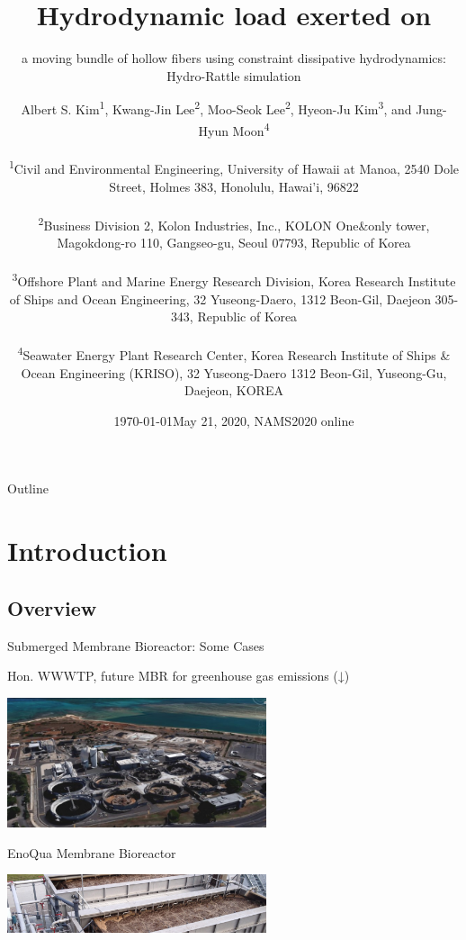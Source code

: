 \documentclass[t,presentation]{beamer}
\date{\tiny\printdayoff\today}
\author{Albert S. Kim\textsuperscript{1}, Kwang-Jin Lee\textsuperscript{2}, Moo-Seok Lee\textsuperscript{2}, Hyeon-Ju Kim\textsuperscript{3}, and Jung-Hyun Moon\textsuperscript{4}  \\ \vspace{.25cm} \\  \tiny   \textsuperscript{1}Civil and Environmental Engineering, University of Hawaii at Manoa, 2540 Dole Street, Holmes 383, Honolulu, Hawai'i, 96822 \\ \vspace{.1cm} \\  \textsuperscript{2}Business Division 2, Kolon Industries, Inc., KOLON One\&only tower, Magokdong-ro 110, Gangseo-gu, Seoul 07793, Republic of Korea \\ \vspace{.1cm} \\  \textsuperscript{3}Offshore Plant and Marine Energy Research Division, Korea Research Institute of Ships and Ocean Engineering, 32 Yuseong-Daero, 1312 Beon-Gil, Daejeon 305-343, Republic of Korea \\ \vspace{.1cm} \\  \textsuperscript{4}Seawater Energy Plant Research Center, Korea Research Institute of Ships \& Ocean Engineering (KRISO), 32 Yuseong-Daero 1312 Beon-Gil, Yuseong-Gu, Daejeon, KOREA \vspace{-.75cm}}
\date{May 21, 2020, NAMS2020 online}
\title{Hydrodynamic load exerted on}
\subtitle{a moving bundle of hollow fibers  using constraint dissipative hydrodynamics: Hydro-Rattle simulation}
\begin{document}
\maketitle
\begin{frame}{Outline}
\tableofcontents
\end{frame}



\section{Introduction}
\label{sec:orgda49a61}
\subsection{Overview}
\label{sec:orgd2955f2}
\begin{frame}[label={sec:orgcc2221e}]{Submerged Membrane Bioreactor: Some Cases}
\par Hon. WWWTP, future MBR for greenhouse gas emissions (↓)
\begin{center}
\includegraphics[width=3.0in]{figures/SIWWTP.jpg}
\label{orgfe0a509}
\end{center}
\par  EnoQua Membrane Bioreactor
\begin{center}
\includegraphics[width=3.0in]{figures/adi-mbr-p.jpg}
\label{orgfe0a509}
\end{center}
\end{frame}
\end{document}

